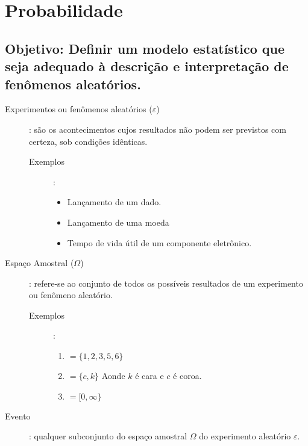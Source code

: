 \documentclass[11pt,a4paper]{book}
\begin{document}
\chapter{Probabilidade}

\section*{Objetivo: Definir um modelo estatístico que seja adequado à descrição e interpretação de fenômenos aleatórios.}
\begin{description}

  \item [Experimentos ou fenômenos aleatórios ($\varepsilon$)]: são os acontecimentos cujos resultados não podem ser previstos 
    com certeza, sob condições idênticas.

    \begin{description}
      \item [Exemplos]:

        \begin{itemize}
          \item Lançamento de um dado.
          \item Lançamento de uma moeda
          \item Tempo de vida útil de um componente eletrônico.
        \end{itemize}
    \end{description}
  \item [Espaço Amostral ($\Omega$)]: refere-se ao conjunto de todos os possíveis resultados de um experimento ou fenômeno 
    aleatório.
    \begin{description}
      \item [Exemplos]:
        \begin{enumerate}[label=$\Omega_{\arabic*}$]
          \item $= \{ 1,2,3,5,6 \}$ 
          \item $= \{ c,k \}$ Aonde $k$ é cara e $c$ é coroa.
          \item $= [ 0,\infty \}$ 
        \end{enumerate}
    \end{description}
  \item [Evento]: qualquer subconjunto do espaço amostral $\Omega$ do experimento aleatório $\varepsilon$.

\end{description}
\end{document}
